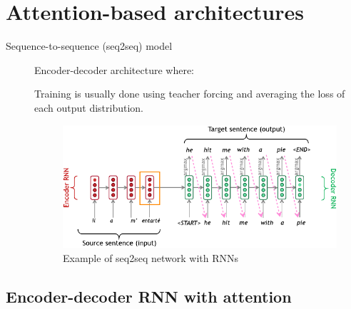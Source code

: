 \chapter{Attention-based architectures}


\begin{description}
    \item[Sequence-to-sequence (seq2seq) model] 
        Encoder-decoder architecture where:

        \begin{remark}
            Training is usually done using teacher forcing and averaging the loss of each output distribution.
        \end{remark}

        \begin{figure}[H]
            \centering
            \includegraphics[width=0.7\linewidth]{./img/_seq2seq.pdf}
            \caption{Example of seq2seq network with RNNs}
        \end{figure}
\end{description}



\section{Encoder-decoder RNN with attention}

